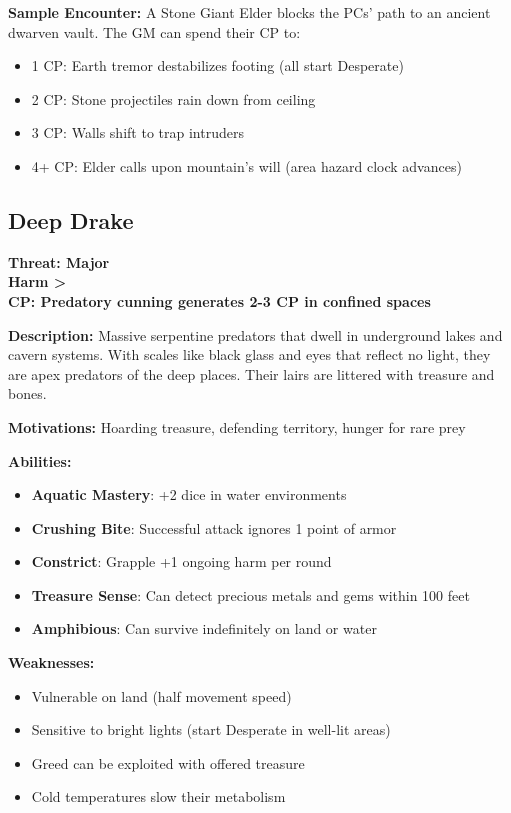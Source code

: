 \documentclass[12pt]{article}
\newcommand{\cp}[1]{\textbf{CP: #1}}
\newcommand{\harm}[1]{\textbf{Harm #1}}
\newcommand{\threat}[1]{\textbf{Threat: #1}}
\begin{document}
\textbf{Sample Encounter:}
A Stone Giant Elder blocks the PCs' path to an ancient dwarven vault. The GM can spend their CP to:
\begin{itemize}
\item 1 CP: Earth tremor destabilizes footing (all start Desperate)
\item 2 CP: Stone projectiles rain down from ceiling
\item 3 CP: Walls shift to trap intruders
\item 4+ CP: Elder calls upon mountain's will (area hazard clock advances)
\end{itemize}

\subsection*{Deep Drake}

\threat{Major} \\
\harm{>} \\
\cp{Predatory cunning generates 2-3 CP in confined spaces}

\vspace{0.5em}
\textbf{Description:} Massive serpentine predators that dwell in underground lakes and cavern systems. With scales like black glass and eyes that reflect no light, they are apex predators of the deep places. Their lairs are littered with treasure and bones.

\textbf{Motivations:} Hoarding treasure, defending territory, hunger for rare prey

\textbf{Abilities:}
\begin{itemize}
\item \textbf{Aquatic Mastery}: +2 dice in water environments
\item \textbf{Crushing Bite}: Successful attack ignores 1 point of armor
\item \textbf{Constrict}: Grapple +1 ongoing harm per round
\item \textbf{Treasure Sense}: Can detect precious metals and gems within 100 feet
\item \textbf{Amphibious}: Can survive indefinitely on land or water
\end{itemize}

\textbf{Weaknesses:}
\begin{itemize}
\item Vulnerable on land (half movement speed)
\item Sensitive to bright lights (start Desperate in well-lit areas)
\item Greed can be exploited with offered treasure
\item Cold temperatures slow their metabolism
\end{itemize}
\end{document}
